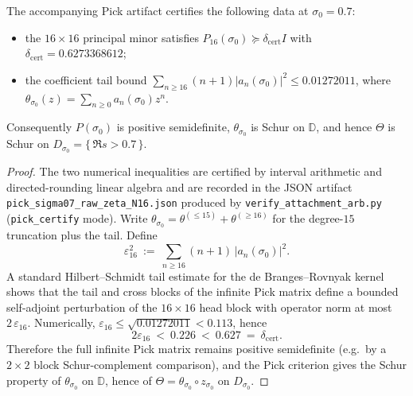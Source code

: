 \documentclass[11pt]{article}
\begin{document}
\begin{proposition}[Certified Pick gap at $\sigma_0=0.7$]\label{prop:pick-gap}
The accompanying Pick artifact certifies the following data at $\sigma_0=0.7$:
\begin{itemize}
\item the $16\times 16$ principal minor satisfies $P_{16}(\sigma_0)\succeq \delta_{\mathrm{cert}} I$ with $\delta_{\mathrm{cert}}=0.6273368612$;
\item the coefficient tail bound $\sum_{n\ge 16}(n+1)|a_n(\sigma_0)|^2\le 0.01272011$, where $\theta_{\sigma_0}(z)=\sum_{n\ge 0}a_n(\sigma_0)z^n$.
\end{itemize}
Consequently $P(\sigma_0)$ is positive semidefinite, $\theta_{\sigma_0}$ is Schur on $\mathbb D$, and hence $\Theta$ is Schur on $D_{\sigma_0}=\{\,\Re s>0.7\,\}$.
\end{proposition}
\begin{proof}
The two numerical inequalities are certified by interval arithmetic and directed-rounding linear algebra and are recorded in the JSON artifact
\texttt{pick\_sigma07\_raw\_zeta\_N16.json} produced by \texttt{verify\_attachment\_arb.py} (\texttt{pick\_certify} mode).
Write $\theta_{\sigma_0}=\theta^{(\le 15)}+\theta^{(\ge 16)}$ for the degree-$15$ truncation plus the tail.
Define
\[
  \varepsilon_{16}^2\ :=\ \sum_{n\ge 16}(n+1)\,|a_n(\sigma_0)|^2.
\]
A standard Hilbert--Schmidt tail estimate for the de Branges--Rovnyak kernel shows that the tail and cross blocks of the infinite Pick matrix define a bounded self-adjoint perturbation of the $16\times 16$ head block with operator norm at most $2\,\varepsilon_{16}$.
Numerically, $\varepsilon_{16}\le \sqrt{0.01272011}<0.113$, hence
\[
  2\varepsilon_{16}\ <\ 0.226\ <\ 0.627\ =\ \delta_{\mathrm{cert}}.
\]
Therefore the full infinite Pick matrix remains positive semidefinite (e.g.\ by a $2\times 2$ block Schur-complement comparison), and the Pick criterion gives the Schur property of $\theta_{\sigma_0}$ on $\mathbb D$, hence of $\Theta=\theta_{\sigma_0}\circ z_{\sigma_0}$ on $D_{\sigma_0}$.
\end{proof}
\end{document}
